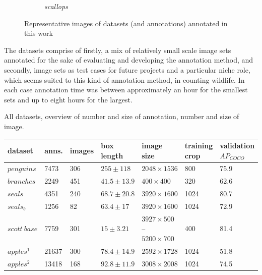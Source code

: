 \begin{figure}[h!]
\begin{subfigure}[t]{0.24\linewidth}
  \caption{\emph{scallops}}
\end{subfigure}
\caption{Representative images of datasets (and annotations) annotated in this work}
\label{fig:datasets_all}
\end{figure}

The datasets comprise of firstly, a mix of relatively small scale image sets annotated for the sake of evaluating and developing the annotation method, and secondly, image sets as test cases for future projects and a particular niche role, which seems suited to this kind of annotation method, in counting wildlife. In each case annotation time was between approximately an hour for the smallest sets and up to eight hours for the largest.

\begin{threeparttable}[!h]
\label{tab:resolutions}
\centering
\caption{All datasets, overview of number and size of annotation, number and size of image.  } 
\begin{tabular}{lllllll}
dataset & anns. & images & box length & image size & \shortstack{training \\ crop} & \shortstack{validation \\ $AP_{COCO}$} \\
\toprule
$penguins$        & 7473        & 306    & $255 \pm 118$   &  $2048\times1536$  & 800                                   & 75.9                   \\
$branches$        & 2249        & 451    & $41.5 \pm 13.9$ &  $400\times400$    & 320                                   & 62.6                   \\
$seals$           & 4351        & 240    & $68.7 \pm 20.8$ &  $3920\times1600$  & 1024                                    & 80.7                   \\
$seals_b$         & 1256        & 82     & $63.4 \pm 17$   & $3920\times1600$  & 1024                                                     & 72.9        \\
$scott\:base$     & 7759        & 301    & $15 \pm 3.21$     & \shortstack[l]{$3927\times500$ -- \\ $5200\times700$} & 400  & 81.4  \\
$apples^1$        & 21637       & 300    & $78.4 \pm 14.9$ &  $2592\times1728$ & 1024 & 51.8                   \\
$apples^2$        & 13418       & 168    & $92.8 \pm 11.9$ &  $3008\times2008$  & 1024                                    & 74.5                   \\

\end{tabular}
\end{threeparttable}
